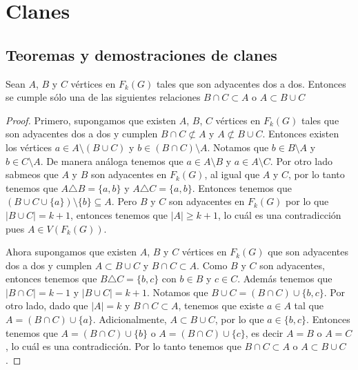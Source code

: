 \chapter{Clanes}%
\label{cap:clanes}

\section{Teoremas y demostraciones de clanes}%
\label{sec:etiquetas}


\begin{lema}%
        \label{lem:adyacencia de tres vertices}
        Sean $A$, $B$ y $C$ v\'ertices en $F_k(G)$ tales que son adyacentes dos
        a dos. Entonces se cumple s\'olo una de las siguientes relaciones $B
        \cap C \subset A$ o $A \subset B \cup C$
        \end{lema}

    
    \begin{proof}
        Primero, supongamos que existen $A$, $B$, $C$ v\'ertices en $F_k(G)$
        tales que son adyacentes dos a dos y cumplen $B \cap C \not\subset A$ y
        $A \not\subset B \cup C$. Entonces existen los v\'ertices  $a \in A
        \setminus (B \cup C)$ y $b \in (B \cap C)\setminus A$. Notamos que $b
        \in B \setminus A$ y $b \in C \setminus A$. De manera an\'aloga tenemos
        que $a \in A \setminus B$ y $a \in A \setminus C$. Por otro lado sabmeos
        que $A$ y $B$ son adyacentes en $F_k(G)$, al igual que $A$ y $C$, por lo
        tanto tenemos que $A \triangle B = \{a,b\}$ y $A \triangle C = \{a,
        b\}$. Entonces tenemos que $(B \cup C \cup \{a\})\setminus \{b\}
        \subseteq A$. Pero $B$ y $C$ son adyacentes en $F_k(G)$ por lo que $|B
        \cup C| = k+1$, entonces tenemos que $|A| \geq k+1$, lo cu\'al es una
        contradicci\'on pues $A \in V (F_k(G))$. 

        Ahora supongamos que existen $A$, $B$ y $C$ v\'ertices en $F_k(G)$ que
        son adyacentes dos a dos y cumplen $A \subset B \cup C$ y $B \cap C
        \subset A$. Como $B$ y $C$ son adyacentes, entonces tenemos que $B
        \triangle C = \{b,c\}$ con $b \in B$ y $c \in C$. Adem\'as tenemos que
        $|B \cap C| = k-1$ y $|B \cup C| = k +1$. Notamos que $B \cup C = (B\cap
        C) \cup \{b,c\}$. Por otro lado, dado que $|A|=k$ y $B \cap C \subset
        A$, tenemos que existe $a \in A$ tal que $A = (B \cap C) \cup \{a\}$.
        Adicionalmente, $A \subset B \cup C$, por lo que $a \in \{b, c\}$.
        Entonces tenemos que $A = (B \cap C) \cup \{b\}$ o $A = (B \cap C) \cup
        \{c\}$, es decir $A = B$ o $A=C$, lo cu\'al es una contradicci\'on. Por
        lo tanto tenemos que $B \cap C \subset A$ o $A \subset B \cup C$.
    \end{proof}

